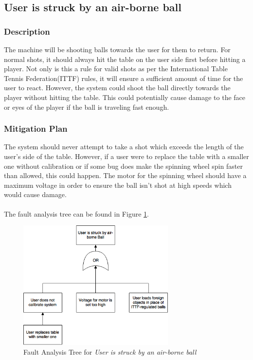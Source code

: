 \documentclass[11pt]{article}
\begin{document}
\subsection{User is struck by an air-borne ball}
\subsubsection*{Description}
The machine will be shooting balls towards the user for them to return. For normal shots, it should always hit the table on the user side first before hitting a player. Not only is this a rule for valid shots as per the International Table Tennis Federation(ITTF) rules, it will ensure a sufficient amount of time for the user to react. However, the system could shoot the ball directly towards the player without hitting the table. This could potentially cause damage to the face or eyes of the player if the ball is traveling fast enough.
\subsubsection*{Mitigation Plan}
The system should never attempt to take a shot which exceeds the length of the user's side of the table. However, if a user were to replace the table with a smaller one without calibration or if some bug does make the spinning wheel spin faster than allowed, this could happen. The motor for the spinning wheel should have a maximum voltage in order to ensure the ball isn't shot at high speeds which would cause damage. \\ \\
The fault analysis tree can be found in Figure \ref{fig:ft-Air}.
\begin{figure}[H]
   \centering
   \includegraphics[width=0.7\textwidth]{img/ft-Air.png} %
   \caption{Fault Analysis Tree for \textit{User is struck by an air-borne ball}}
   \label{fig:ft-Air}
\end{figure}
\end{document}
